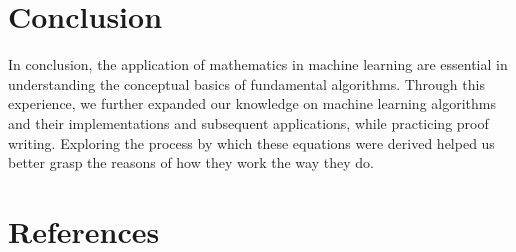 \documentclass[11pt]{article}
\begin{document}
\section{Conclusion}
In conclusion, the application of mathematics in machine learning are essential in understanding the conceptual basics of fundamental algorithms. Through this experience, we further expanded our knowledge on machine learning algorithms and their implementations and subsequent applications, while practicing proof writing. Exploring the process by which these equations were derived helped us better grasp the reasons of how they work the way they do. 
\section{References}
\nocite{1}
\nocite{2}
\nocite{3}
\nocite{4}
\nocite{5}
\nocite{6}
\nocite{7}
\nocite{8}
\nocite{9}

\end{document}
